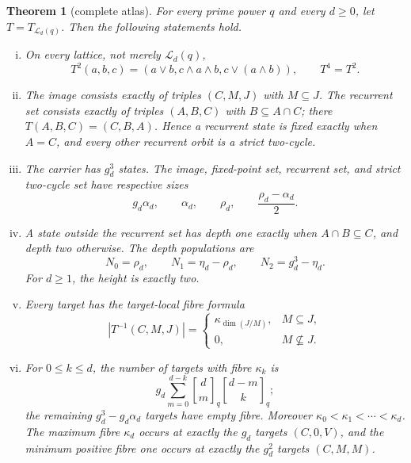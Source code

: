 \documentclass[a4paper,10pt]{amsart}
\newtheorem{theorem}{Theorem}
\theoremstyle{remark}
\newcommand{\cL}{\mathcal L}
\newcommand{\qbinom}[2]{\genfrac{[}{]}{0pt}{}{#1}{#2}_{q}}
\newcommand{\meet}{\mathbin{\cap}}
\begin{document}
\begin{theorem}[complete atlas]\label{thm:main}
For every prime power $q$ and every $d\ge0$, let $T=T_{\cL_d(q)}$.
Then the following statements hold.
\begin{enumerate}[(i)]
\item On every lattice, not merely $\cL_d(q)$,
\begin{equation}\label{eq:square-collapse}
 T^2(a,b,c)=(a\vee b,c\wedge a\wedge b,c\vee(a\wedge b)),
 \qquad T^4=T^2.
\end{equation}

\item The image consists exactly of triples $(C,M,J)$ with $M\subseteq J$.
The recurrent set consists exactly of triples $(A,B,C)$ with
$B\subseteq A\meet C$; there $T(A,B,C)=(C,B,A)$.  Hence a recurrent state is
fixed exactly when $A=C$, and every other recurrent orbit is a strict
two-cycle.

\item The carrier has $g_d^3$ states.  The image, fixed-point set, recurrent
set, and strict two-cycle set have respective sizes
\begin{equation}\label{eq:basic-counts}
 g_d\alpha_d,\qquad \alpha_d,\qquad \rho_d,
 \qquad \frac{\rho_d-\alpha_d}{2}.
\end{equation}

\item A state outside the recurrent set has depth one exactly when
$A\meet B\subseteq C$, and depth two otherwise.  The depth populations are
\begin{equation}\label{eq:depth-counts}
           N_0=\rho_d,\qquad N_1=\eta_d-\rho_d,
           \qquad N_2=g_d^3-\eta_d.
\end{equation}
For $d\ge1$, the height is exactly two.

\item Every target has the target-local fibre formula
\begin{equation}\label{eq:fibre}
 |T^{-1}(C,M,J)|=
 \begin{cases}
  \kappa_{\dim(J/M)},&M\subseteq J,\\
  0,&M\not\subseteq J.
 \end{cases}
\end{equation}

\item For $0\le k\le d$, the number of targets with fibre $\kappa_k$ is
\begin{equation}\label{eq:fibre-histogram}
 g_d\sum_{m=0}^{d-k}\qbinom dm\qbinom{d-m}k;
\end{equation}
the remaining $g_d^3-g_d\alpha_d$ targets have empty fibre.  Moreover
$\kappa_0<\kappa_1<\cdots<\kappa_d$.  The maximum fibre $\kappa_d$ occurs
at exactly the $g_d$ targets $(C,0,V)$, and the minimum positive fibre one
occurs at exactly the $g_d^2$ targets $(C,M,M)$.
\end{enumerate}
\end{theorem}
\end{document}
